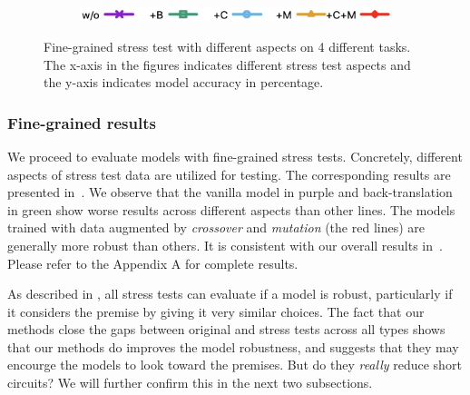 \begin{figure}[th]
\newpage
\begin{subfigure}[b]{1.0\textwidth}
\centering
\includegraphics[width=0.3\columnwidth]{data/label.jpg}
\label{fig:label}
\end{subfigure}
\caption{Fine-grained stress test with different aspects on 4 different tasks. 
The x-axis in the figures indicates different stress test aspects and the y-axis indicates model accuracy in percentage.}
\label{fig:detail}
\end{figure}

\subsubsection{Fine-grained results}
\label{sec:overview}
We proceed to evaluate models with fine-grained stress tests. 
Concretely, different aspects of stress test data are 
utilized for testing. 
The corresponding results are presented in~. 
We observe that the vanilla model in purple and back-translation in green show
worse results across different aspects than other lines. 
The models trained with data augmented by \textit{crossover} and \textit{mutation} 
(the red lines) are generally more robust than others.
It is consistent with our overall results in~. 
Please refer to the Appendix A for complete results. 

As described in ,
all stress tests 
can evaluate if a model is robust, particularly if it considers the 
premise by giving it very similar choices. 
The fact that our methods close the gaps between original and stress tests
across all types shows that our methods do improves the model robustness,
and suggests that they may encourge the models to look toward the
premises.
But do they \textit{really} reduce short circuits? We will further confirm this
in the next two subsections.

